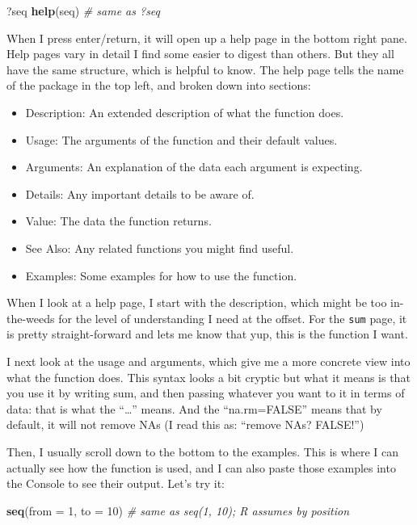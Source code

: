 \documentclass[]{book}
\newenvironment{Shaded}{\begin{snugshade}}{\end{snugshade}}
\newcommand{\CommentTok}[1]{\textcolor[rgb]{0.56,0.35,0.01}{\textit{#1}}}
\newcommand{\DataTypeTok}[1]{\textcolor[rgb]{0.13,0.29,0.53}{#1}}
\newcommand{\DecValTok}[1]{\textcolor[rgb]{0.00,0.00,0.81}{#1}}
\newcommand{\KeywordTok}[1]{\textcolor[rgb]{0.13,0.29,0.53}{\textbf{#1}}}
\newcommand{\NormalTok}[1]{#1}
\providecommand{\tightlist}{%
  \setlength{\itemsep}{0pt}\setlength{\parskip}{0pt}}
\begin{document}
\begin{Shaded}
\begin{Highlighting}[]
\NormalTok{?seq }
\KeywordTok{help}\NormalTok{(seq) }\CommentTok{# same as ?seq}
\end{Highlighting}
\end{Shaded}

When I press enter/return, it will open up a help page in the bottom right pane. Help pages vary in detail I find some easier to digest than others. But they all have the same structure, which is helpful to know. The help page tells the name of the package in the top left, and broken down into sections:

\begin{itemize}
\tightlist
\item
  Description: An extended description of what the function does.
\item
  Usage: The arguments of the function and their default values.
\item
  Arguments: An explanation of the data each argument is expecting.
\item
  Details: Any important details to be aware of.
\item
  Value: The data the function returns.
\item
  See Also: Any related functions you might find useful.
\item
  Examples: Some examples for how to use the function.
\end{itemize}

When I look at a help page, I start with the description, which might be too in-the-weeds for the level of understanding I need at the offset. For the \texttt{sum} page, it is pretty straight-forward and lets me know that yup, this is the function I want.

I next look at the usage and arguments, which give me a more concrete view into what the function does. This syntax looks a bit cryptic but what it means is that you use it by writing sum, and then passing whatever you want to it in terms of data: that is what the ``\ldots{}'' means. And the ``na.rm=FALSE'' means that by default, it will not remove NAs (I read this as: ``remove NAs? FALSE!'')

Then, I usually scroll down to the bottom to the examples. This is where I can actually see how the function is used, and I can also paste those examples into the Console to see their output. Let's try it:

\begin{Shaded}
\begin{Highlighting}[]
\KeywordTok{seq}\NormalTok{(}\DataTypeTok{from =} \DecValTok{1}\NormalTok{, }\DataTypeTok{to =} \DecValTok{10}\NormalTok{) }\CommentTok{# same as seq(1, 10); R assumes by position}
\end{Highlighting}
\end{Shaded}
\end{document}
